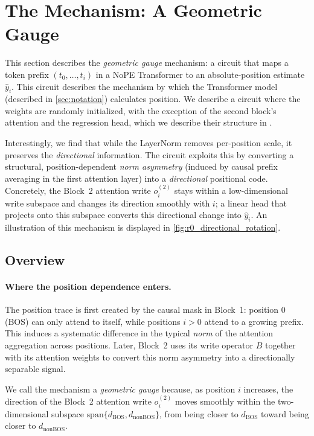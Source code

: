 \documentclass{article}
\theoremstyle{plain}
\theoremstyle{definition}
\theoremstyle{remark}
\begin{document}




\section{The Mechanism: A Geometric Gauge}
\label{sec:mechanism_text}
This section describes the \emph{geometric gauge} mechanism: a circuit that maps a token prefix $(t_0,\dots,t_i)$ in a NoPE Transformer
to an absolute-position estimate $\hat y_i$.
This circuit describes the mechanism by which the Transformer model (described in \ref{sec:notation}) calculates position. We describe a circuit where the weights are randomly initialized, with the exception of the second block's attention and the regression head, which we describe their structure in .

Interestingly, we find that while the LayerNorm removes per-position scale, it preserves the \emph{directional} information.
The circuit exploits this by converting a structural, position-dependent \emph{norm asymmetry} (induced by causal prefix averaging in the first attention layer)
into a \emph{directional} positional code.
Concretely, the Block~2 attention write $o_i^{(2)}$ stays within a low-dimensional write subspace and changes its direction smoothly with $i$;
a linear head that projects onto this subspace converts this directional change into $\hat y_i$.
An illustration of this mechanism is displayed in \cref{fig:r0_directional_rotation}.

\subsection{Overview}
\paragraph{Where the position dependence enters.}
The position trace is first created by the causal mask in Block~1: position $0$ (BOS) can only attend to itself, while positions $i>0$ attend to a growing prefix.
This induces a systematic difference in the typical \emph{norm} of the attention aggregation across positions.
Later, Block~2 uses its write operator $B$ together with its attention weights to convert this norm asymmetry into a directionally separable signal.

We call the mechanism a \emph{geometric gauge} because, as position $i$ increases, the direction of the Block~2 attention write $o_i^{(2)}$
moves smoothly within the two-dimensional subspace $\mathrm{span}\{d_{\text{BOS}}, d_{\text{nonBOS}}\}$, from being closer to $d_{\text{BOS}}$
toward being closer to $d_{\text{nonBOS}}$.
\end{document}

